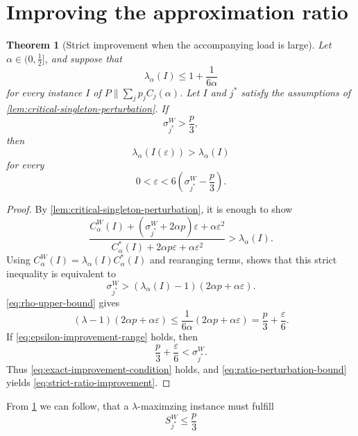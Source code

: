 \documentclass[11pt]{article}
\newtheorem{theorem}[lemma]{Theorem}
\newcommand{\OptCost}{C_{\alpha}^{*}(I)}
\newcommand{\WorstCost}{C_{\alpha}^{W}(I)}
\newcommand{\LamI}{\lambda_{\alpha}(I)}
\begin{document}
\section{Improving the approximation ratio}

\begin{theorem}[Strict improvement when the accompanying load is large]
\label{thm:strict-perturbation-improvement}
Let $\alpha\in(0,\tfrac12]$, and suppose that
\begin{equation}
    \LamI\leq 1+\frac{1}{6\alpha}
    \label{eq:rho-upper-bound}
\end{equation}
for every instance $I$ of
$P\parallel\sum_jp_jC_j(\alpha)$.  Let $I$ and $j^*$ satisfy the
assumptions of
\ref{lem:critical-singleton-perturbation}.  If
\[
    \sigma^{W}_{j^*}>\frac p3,
\]
then
\begin{equation}
    \boxed{\lambda_{\alpha}(I(\varepsilon))>\LamI}
    \label{eq:strict-ratio-improvement}
\end{equation}
for every
\begin{equation}
    0<\varepsilon<
    6\left(\sigma^{W}_{j^*}-\frac p3\right).
    \label{eq:epsilon-improvement-range}
\end{equation}
\end{theorem}

\begin{proof}
By
\ref{lem:critical-singleton-perturbation}, it is enough to show
\[
    \frac{
        \WorstCost+(\sigma^{W}_{j^*}+2\alpha p)\varepsilon
        +\alpha\varepsilon^2
    }{
        \OptCost+2\alpha p\varepsilon
        +\alpha\varepsilon^2
    }
    >\LamI.
\]
Using $\WorstCost=\LamI\OptCost$ and rearanging terms, shows
that this strict inequality is equivalent to
\begin{equation}
    \sigma^{W}_{j^*}>
    (\LamI-1)(2\alpha p+\alpha\varepsilon).
    \label{eq:exact-improvement-condition}
\end{equation}
\eqref{eq:rho-upper-bound} gives
\[
    (\lambda-1)(2\alpha p+\alpha\varepsilon)
    \leq
    \frac{1}{6\alpha}
    (2\alpha p+\alpha\varepsilon)
    =
    \frac p3+\frac{\varepsilon}{6}.
\]
If \eqref{eq:epsilon-improvement-range} holds, then
\[
    \frac p3+\frac{\varepsilon}{6}<\sigma^{W}_{j^*}.
\]
Thus \eqref{eq:exact-improvement-condition} holds, and
\eqref{eq:ratio-perturbation-bound} yields
\eqref{eq:strict-ratio-improvement}.
\end{proof}
From \ref{thm:strict-perturbation-improvement} we can follow, that a $\lambda$-maximzing instance must fulfill
\[
S_{j^*}^{W} \le \frac{p}{3}
\]
\end{document}
